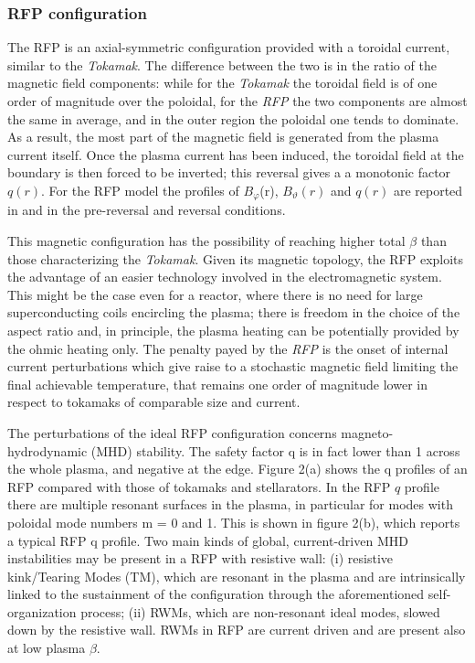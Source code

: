 \subsubsection{RFP configuration}
The \ac{RFP} is an axial-symmetric configuration provided with a toroidal current, similar to the \textit{Tokamak}. The difference between the two is in the ratio of the magnetic field components: while for the \textit{Tokamak} the toroidal field is of one order of magnitude over the poloidal, for the \textit{RFP} the two components are almost the same in average, and in the outer region the poloidal one tends to dominate. As a result, the most part of the magnetic field is generated from the plasma current itself.
Once the plasma current has been induced, the toroidal field at the boundary is then forced to be inverted; this reversal gives a  a monotonic factor $q(r)$. For the \acs{RFP} model the profiles of $B_\varphi$(r), $B_\vartheta(r)$ and $q(r)$ are reported in \Figure{\ref{fig:intro_safety_factor_profiles_b}} and \Figure{\ref{fig:intro_safety_factor_profiles_c}} in the pre-reversal and reversal conditions.

This magnetic configuration has the possibility of reaching higher total $\beta$ than those characterizing the \textit{Tokamak}. 
Given its magnetic topology, the RFP exploits the advantage of an easier technology involved in the electromagnetic system. This might be the case even for a reactor, where there is no need for large superconducting coils encircling the plasma; there is freedom in the choice of the aspect ratio and, in principle, the plasma heating can be potentially provided by the ohmic heating only.  
The penalty payed by the \textit{RFP} is the onset of internal current perturbations  which give raise to a stochastic magnetic field limiting the final achievable temperature, that remains one order of magnitude lower in respect to tokamaks of comparable size and current.

The perturbations of the ideal RFP configuration concerns magneto-hydrodynamic (MHD) stability. The safety factor q is in fact lower than 1 across the whole plasma, and negative at the edge. Figure 2(a) shows the q profiles of an RFP compared with those of tokamaks and stellarators. In the RFP $q$ profile there are multiple resonant surfaces in the plasma, in particular for modes with poloidal mode numbers m = 0 and 1. This is shown in figure 2(b), which reports a typical RFP q profile. Two main kinds of global, current-driven MHD instabilities may be present in a RFP with resistive wall: (i) resistive kink/Tearing Modes (TM), which are resonant in the plasma and are intrinsically linked to the sustainment of the configuration through the aforementioned self-organization process; (ii) RWMs, which are non-resonant ideal modes, slowed down by the resistive wall. RWMs in RFP are current driven and are present also at low plasma $\beta$.


